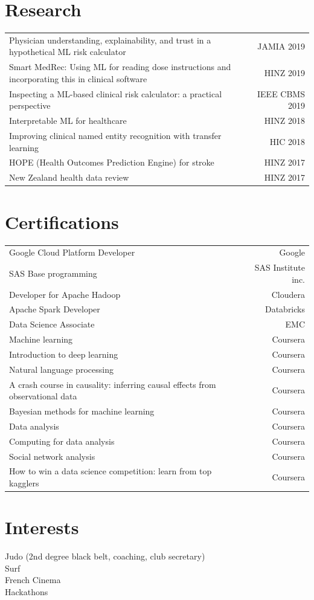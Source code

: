 \documentclass[letterpaper,11pt]{article}
\begin{document}
\section{Research} 
\begin{tabular*}{\textwidth}{l@{\extracolsep{\fill}}r}
Physician understanding, explainability, and trust in a hypothetical ML risk calculator & JAMIA 2019\\
{\small Smart MedRec: Using ML for reading dose instructions and incorporating this in clinical software} & HINZ 2019\\
Inspecting a ML-based clinical risk calculator: a practical perspective & IEEE CBMS 2019\\
Interpretable ML for healthcare & HINZ 2018\\
Improving clinical named entity recognition with transfer learning &  HIC 2018\\
HOPE (Health Outcomes Prediction Engine) for stroke & HINZ 2017\\
New Zealand health data review & HINZ 2017\\
\end{tabular*}

\section{Certifications}
\begin{tabular*}{\textwidth}{l@{\extracolsep{\fill}}r}
Google Cloud Platform Developer & Google \\
SAS Base programming & SAS Institute inc.\\
Developer for Apache Hadoop & Cloudera\\
Apache Spark Developer & Databricks\\
Data Science Associate & EMC\\
Machine learning & Coursera \\
Introduction to deep learning & Coursera\\
Natural language processing & Coursera\\
A crash course in causality: inferring causal effects from observational data & Coursera\\
Bayesian methods for machine learning & Coursera\\ 
Data analysis & Coursera\\
Computing for data analysis & Coursera\\
Social network analysis & Coursera\\
How to win a data science competition: learn from top kagglers & Coursera\\
\end{tabular*}


\section{Interests}
Judo (2nd degree black belt, coaching, club secretary)\\
Surf\\French Cinema\\
Hackathons\\
\end{document}
